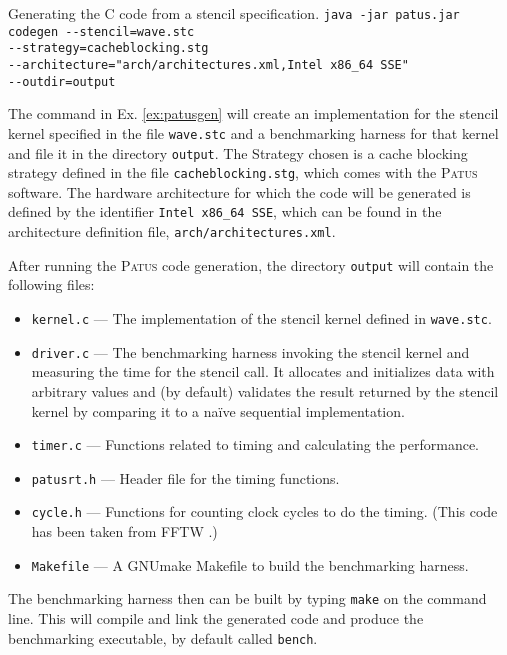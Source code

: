 \begin{example}{Generating the C code from a stencil specification.}
	\label{ex:patusgen}
	\footnotesize
	\noindent\texttt{java -jar patus.jar codegen -{}-stencil=wave.stc} \\
	\phantom{XXX}\texttt{-{}-strategy=cacheblocking.stg} \\
	\phantom{XXX}\texttt{-{}-architecture="arch/architectures.xml,Intel x86\_64 SSE"} \\
	\phantom{XXX}\texttt{-{}-outdir=output}
\end{example}

The command in Ex. \ref{ex:patusgen} will create an implementation for the stencil kernel specified
in the file \texttt{wave.stc} and a benchmarking harness for that kernel and file it in the directory
\texttt{output}. The Strategy chosen is a cache blocking strategy defined in the file \texttt{cacheblocking.stg},
which comes with the \textsc{Patus} software. The hardware architecture for which the code will be
generated is defined by the identifier \texttt{Intel x86\_64 SSE}, which can be found in the architecture
definition file, \texttt{arch/architectures.xml}.

After running the \textsc{Patus} code generation, the directory \texttt{output} will contain the following files:
\begin{itemize}
	\item \texttt{kernel.c} --- The implementation of the stencil kernel defined in \texttt{wave.stc}.
	\item \texttt{driver.c} --- The benchmarking harness invoking the stencil kernel and measuring the
		time for the stencil call. It allocates and initializes data with arbitrary values and (by default)
		validates the result returned by the stencil kernel by comparing it to a na\"ive sequential implementation.
	\item \texttt{timer.c} --- Functions related to timing and calculating the performance.
	\item \texttt{patusrt.h} --- Header file for the timing functions.
	\item \texttt{cycle.h} --- Functions for counting clock cycles to do the timing. (This code has been taken from FFTW \cite{fftw05}.)
	\item \texttt{Makefile} --- A GNUmake Makefile to build the benchmarking harness.
\end{itemize}

The benchmarking harness then can be built by typing \texttt{make} on the command line. This will compile and
link the generated code and produce the benchmarking executable, by default called \texttt{bench}.


